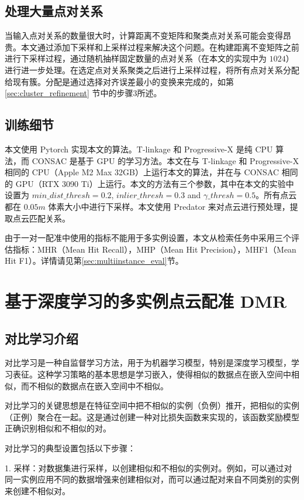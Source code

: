 \subsection{处理大量点对关系}
当输入点对关系的数量很大时，计算距离不变矩阵和聚类点对关系可能会变得昂贵。本文通过添加下采样和上采样过程来解决这个问题。在构建距离不变矩阵之前进行下采样过程，通过随机抽样固定数量的点对关系（在本文的实现中为 $1024$）进行进一步处理。在选定点对关系聚类之后进行上采样过程，将所有点对关系分配给现有簇。分配是通过选择对齐误差最小的变换来完成的，如第 \ref{sec:cluster_refinement} 节中的步骤3所述。

\subsection{训练细节}
本文使用 Pytorch 实现本文的算法。T-linkage 和 Progressive-X 是纯 CPU 算法，而 CONSAC 是基于 GPU 的学习方法。本文在与 T-linkage 和 Progressive-X 相同的 CPU（Apple M2 Max 32GB）上运行本文的算法，并在与 CONSAC 相同的 GPU（RTX 3090 Ti）上运行。本文的方法有三个参数，其中在本文的实验中设置为 $min\_dist\_thresh=0.2$, $inlier\_thresh=0.3$ and $\gamma\_thresh=0.5$。所有点云都在 $0.05m$ 体素大小中进行下采样。本文使用 Predator \cite{huang2021predator} 来对点云进行预处理，提取点云匹配关系。

由于一对一配准中使用的指标不能用于多实例设置，本文从检索任务中采用三个评估指标：MHR（Mean Hit Recall），MHP（Mean Hit Precision），MHF1（Mean Hit F1）。详情请见第\ref{sec:multiinstance_eval}节。

\section{基于深度学习的多实例点云配准 DMR}
\subsection{对比学习介绍}
对比学习是一种自监督学习方法，用于为机器学习模型，特别是深度学习模型，学习表征。这种学习策略的基本思想是学习嵌入，使得相似的数据点在嵌入空间中相似，而不相似的数据点在嵌入空间中不相似。

对比学习的关键思想是在特征空间中把不相似的实例（负例）推开，把相似的实例（正例）聚合在一起。这是通过创建一种对比损失函数来实现的，该函数奖励模型正确识别相似和不相似的对。

对比学习的典型设置包括以下步骤：

1. 采样：对数据集进行采样，以创建相似和不相似的实例对。例如，可以通过对同一实例应用不同的数据增强来创建相似对，而可以通过配对来自不同类别的实例来创建不相似对。

